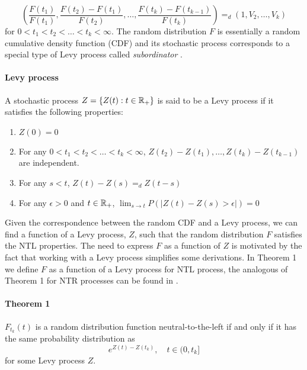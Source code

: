 \begin{equation}\label{increments_NTL_F}
\left(\frac{F(t_1)}{F(t_1)}, \frac{F(t_2) - F(t_1)}{F(t_2)}, \ldots, \frac{F(t_k) - F(t_{k-1})}{F(t_{k})} \right) =_d \left(1, V_2, \ldots, V_k\right)
\end{equation}
for $0 < t_1 < t_2 < \ldots < t_k < \infty$. The random distribution $F$ is essentially a random cumulative density function (CDF) and its stochastic process corresponds to a special type of Levy process called \textit{subordinator} \cite{orbanz2012lecture}. 

\paragraph{Levy process} \cite{papapantoleon2008introduction} A stochastic process $Z = \{Z(t) : t \in \mathbb{R}_+\}$ is said to be a Levy process if it satisfies the following properties:
	\begin{enumerate}
		\item $Z(0) = 0$
		\item For any $0 < t_1 < t_2 < \ldots < t_k < \infty$, $Z(t_2) - Z(t_1), \ldots, Z(t_k) - Z(t_{k-1})$ are independent.
		\item For any $s < t$, $Z(t) - Z(s) =_d Z(t-s)$
		\item For any $\epsilon> 0$ and $t \in \mathbb{R}_{+}$, $\lim_{s \rightarrow t}P( |Z(t)-Z(s) > \epsilon|) = 0$
	\end{enumerate}

Given the correspondence between the random CDF and a Levy process, we can find a function of a Levy process, $Z$, such that the random distribution $F$ satisfies the NTL properties. The need to express $F$ as a function of $Z$ is motivated by the fact that working with a Levy process simplifies some derivations. In Theorem 1 we define $F$ as a function of a Levy process for NTL process, the analogous of Theorem 1 for NTR processes can be found in \cite{doksum1974tailfree}.

\paragraph{Theorem 1} $F_{t_k}(t)$ is a random distribution function neutral-to-the-left if and only if it has the same probability distribution as
\begin{equation}\label{NTL_eq}
e^{Z(t) - Z(t_k)}, \quad t \in (0, t_k]
\end{equation}
for some Levy process $Z$.


